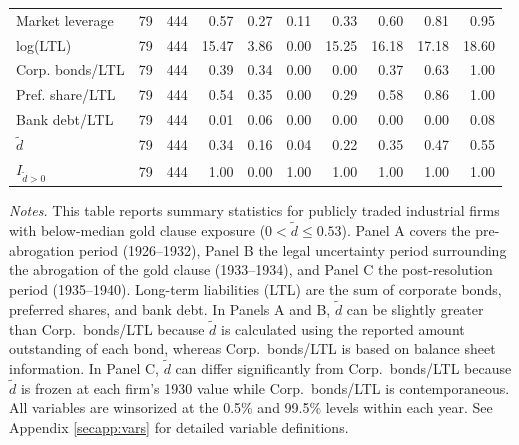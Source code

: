 \begin{table}[p]
\begin{threeparttable}
\begin{tabular}{lrrrrrrrrr}
            Market leverage & 79 & 444 & 0.57 & 0.27 & 0.11 & 0.33 & 0.60 & 0.81 & 0.95 \\
            log(LTL) & 79 & 444 & 15.47 & 3.86 & 0.00 & 15.25 & 16.18 & 17.18 & 18.60 \\
            Corp. bonds/LTL & 79 & 444 & 0.39 & 0.34 & 0.00 & 0.00 & 0.37 & 0.63 & 1.00 \\
            Pref. share/LTL & 79 & 444 & 0.54 & 0.35 & 0.00 & 0.29 & 0.58 & 0.86 & 1.00 \\
            Bank debt/LTL & 79 & 444 & 0.01 & 0.06 & 0.00 & 0.00 & 0.00 & 0.00 & 0.08 \\
            \ensuremath{\tilde{d}} & 79 & 444 & 0.34 & 0.16 & 0.04 & 0.22 & 0.35 & 0.47 & 0.55 \\
            \ensuremath{I_{\tilde{d}>0}} & 79 & 444 & 1.00 & 0.00 & 1.00 & 1.00 & 1.00 & 1.00 & 1.00 \\
            \bottomrule
        \end{tabular}
    \end{threeparttable}
    
    \vspace*{3mm} \justifying \noindent
    \scriptsize{\textit{Notes.} This table reports summary statistics for publicly traded industrial firms with below-median gold clause exposure ($0 < \tilde{d} \leq 0.53$). Panel A covers the pre-abrogation period (1926--1932), Panel B the legal uncertainty period surrounding the abrogation of the gold clause (1933--1934), and Panel C the post-resolution period (1935--1940). Long-term liabilities (LTL) are the sum of corporate bonds, preferred shares, and bank debt. In Panels A and B, $\tilde{d}$ can be slightly greater than Corp.\ bonds/LTL because $\tilde{d}$ is calculated using the reported amount outstanding of each bond, whereas Corp.\ bonds/LTL is based on balance sheet information. In Panel C, $\tilde{d}$ can differ significantly from Corp.\ bonds/LTL because $\tilde{d}$ is frozen at each firm's 1930 value while Corp.\ bonds/LTL is contemporaneous. All variables are winsorized at the 0.5\% and 99.5\% levels within each year. See Appendix \ref{secapp:vars} for detailed variable definitions.}
\end{table}